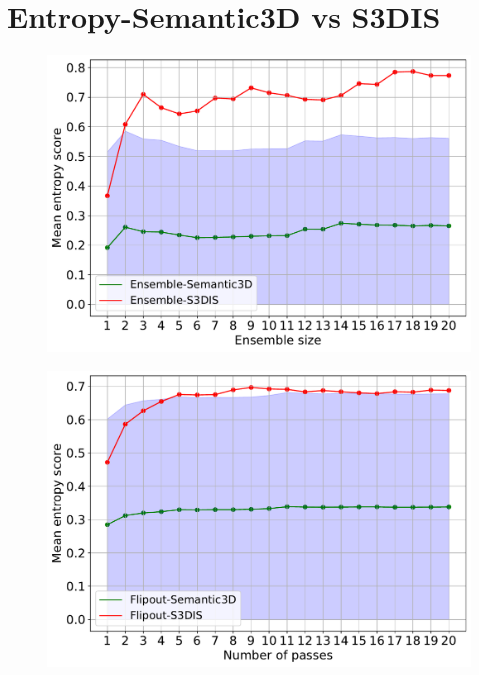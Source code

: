     \section{Entropy-Semantic3D vs S3DIS}
    \label{sec:ent_sem3dvs3dis}
    \begin{figure}[h!]
        \centering
        \includegraphics[scale=0.55]{images/Ensemble_Entropy.pdf}
        \caption{}
        \label{fig:ent_sem3dvs3dis_de}    
    \end{figure}
    \begin{figure}[h!]
        \centering
        \includegraphics[scale=0.55]{images/Flipout_Entropy.pdf}
        \caption{}
        \label{fig:ent_sem3dvs3dis_fout}
    \end{figure}
